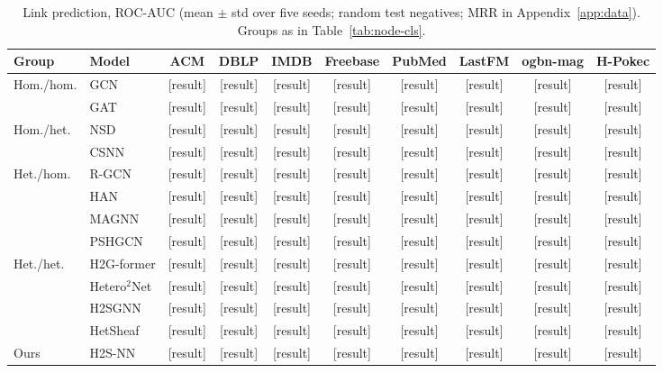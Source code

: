 \documentclass{article}
\newcommand{\method}{\textsc{H2S-NN}}
\newcommand{\res}{{\scriptsize[result]}}
\begin{document}
\begin{table}[!htbp]
  \centering
  \caption{Link prediction, ROC-AUC (mean $\pm$ std over five seeds; random test negatives; MRR in Appendix~\ref{app:data}). Groups as in Table~\ref{tab:node-cls}.}
  \label{tab:link-pred}
  \scriptsize
  \setlength{\tabcolsep}{4pt}
  \begin{tabular}{llcccccccc}
    \toprule
    \textbf{Group} & \textbf{Model} & ACM & DBLP & IMDB & Freebase & PubMed & LastFM & ogbn-mag & H-Pokec \\
    \midrule
    \multirow{2}{*}{Hom./hom.} & GCN & \res & \res & \res & \res & \res & \res & \res & \res \\
    & GAT & \res & \res & \res & \res & \res & \res & \res & \res \\
    \midrule
    \multirow{2}{*}{Hom./het.} & NSD & \res & \res & \res & \res & \res & \res & \res & \res \\
    & CSNN & \res & \res & \res & \res & \res & \res & \res & \res \\
    \midrule
    \multirow{4}{*}{Het./hom.} & R-GCN & \res & \res & \res & \res & \res & \res & \res & \res \\
    & HAN & \res & \res & \res & \res & \res & \res & \res & \res \\
    & MAGNN & \res & \res & \res & \res & \res & \res & \res & \res \\
    & PSHGCN & \res & \res & \res & \res & \res & \res & \res & \res \\
    \midrule
    \multirow{4}{*}{Het./het.} & H2G-former & \res & \res & \res & \res & \res & \res & \res & \res \\
    & Hetero$^2$Net & \res & \res & \res & \res & \res & \res & \res & \res \\
    & H2SGNN & \res & \res & \res & \res & \res & \res & \res & \res \\
    & HetSheaf & \res & \res & \res & \res & \res & \res & \res & \res \\
    \midrule
    Ours & \method{} & \res & \res & \res & \res & \res & \res & \res & \res \\
    \bottomrule
  \end{tabular}
\end{table}
\end{document}
